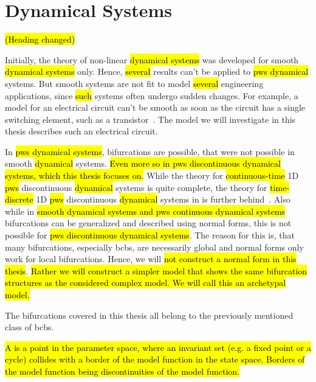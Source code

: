 \section{ Dynamical Systems}
\label{sec:state.discont}

\hl{(Heading changed)}

Initially, the theory of non-linear \hl{dynamical systems} was developed for smooth \hl{dynamical systems} only.
Hence, \hl{several} results can't be applied to \hl{\gls{pws} dynamical} systems.
But smooth systems are not fit to model \hl{several} engineering applications, since \hl{such} systems often undergo sudden changes.
For example, a model for an electrical circuit can't be smooth as soon as the circuit has a single switching element, such as a transistor~\cite{ZhuMos03}.
The model we will investigate in this thesis describes such an electrical circuit.

In \hl{\gls{pws} dynamical systems}, bifurcations are possible, that were not possible in smooth \hl{dynamical} systems.
\hl{Even more so in \gls{pws} discontinuous dynamical systems, which this thesis focuses on.}
While the theory for \hl{continuous-time} 1D \hl{\gls{pws}} discontinuous \hl{dynamical} systems is quite complete, the theory for \hl{time-discrete} 1D \hl{\gls{pws}} discontinuous \hl{dynamical} systems in is further behind~\cite{Simpson16}.
Also while in \hl{smooth dynamical systems and \gls{pws} continuous dynamical systems} bifurcations can be generalized and described using normal forms, this is not possible for \hl{\gls{pws} discontinuous dynamical systems}.
The reason for this is, that many bifurcations, especially \glspl{bcb}, are necessarily global and normal forms only work for local bifurcations.
Hence, we will \hl{not construct a normal form in this thesis}.
\hl{
	Rather we will construct a simpler model that shows the same bifurcation structures as the considered complex model.
	We will call this an archetypal model.
}

The bifurcations covered in this thesis all belong to the previously mentioned class of \glspl{bcb}.

\begin{definition}
	\hl{
		A  is a point in the parameter space, where an invariant set (e.g. a fixed point or a cycle) collides with a border of the model function in the state space.
		Borders of the model function being discontinuities of the model function.
	}
\end{definition}

